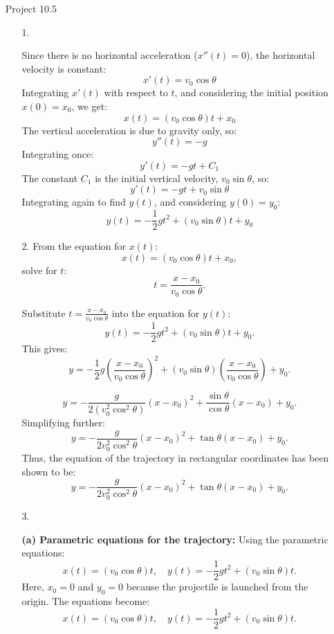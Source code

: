 \documentclass[12pt]{article}
\begin{document}
\begin{enumerate}
\item [Project 10.5]
\begin{enumerate}
    \item [1. ]
    \begin{enumerate} 
    
    Since there is no horizontal acceleration ($x''(t) = 0$), the horizontal velocity is constant:
    \[
    x'(t) = v_0 \cos \theta
    \]
    Integrating $x'(t)$ with respect to $t$, and considering the initial position $x(0) = x_0$, we get:
    \[
    x(t) = (v_0 \cos \theta) t + x_0
    \]
    The vertical acceleration is due to gravity only, so:
    \[
    y''(t) = -g
    \]
    Integrating once:
    \[
    y'(t) = -g t + C_1
    \]
    The constant $C_1$ is the initial vertical velocity, $v_0 \sin \theta$, so:
    \[
    y'(t) = -g t + v_0 \sin \theta
    \]
    Integrating again to find $y(t)$, and considering $y(0) = y_0$:
    \[
    y(t) = -\frac{1}{2} g t^2 + (v_0 \sin \theta) t + y_0
    \]
\end{enumerate}
    \item [2. ]
    From the equation for $x(t)$:
\[
x(t) = (v_0 \cos \theta) t + x_0,
\]
solve for $t$:
\[
t = \frac{x - x_0}{v_0 \cos \theta}.
\]

Substitute $t = \frac{x - x_0}{v_0 \cos \theta}$ into the equation for $y(t)$:
\[
y(t) = -\frac{1}{2} g t^2 + (v_0 \sin \theta) t + y_0.
\]
This gives:
\[
y = -\frac{1}{2} g \left(\frac{x - x_0}{v_0 \cos \theta}\right)^2 + (v_0 \sin \theta) \left(\frac{x - x_0}{v_0 \cos \theta}\right) + y_0.
\]

\[
y = -\frac{g}{2 (v_0^2 \cos^2 \theta)} (x - x_0)^2 + \frac{\sin \theta}{\cos \theta} (x - x_0) + y_0.
\]
Simplifying further:
\[
y = -\frac{g}{2 v_0^2 \cos^2 \theta} (x - x_0)^2 + \tan \theta (x - x_0) + y_0.
\]
Thus, the equation of the trajectory in rectangular coordinates has been shown to be:
\[
y = -\frac{g}{2 v_0^2 \cos^2 \theta} (x - x_0)^2 + \tan \theta (x - x_0) + y_0.
\]

\item [3. ] 

\textbf{(a) Parametric equations for the trajectory:}  
Using the parametric equations:
\[
x(t) = (v_0 \cos \theta) t, \quad y(t) = -\frac{1}{2} g t^2 + (v_0 \sin \theta) t.
\]
Here, $x_0 = 0$ and $y_0 = 0$ because the projectile is launched from the origin. The equations become:
\[
x(t) = (v_0 \cos \theta) t, \quad y(t) = -\frac{1}{2} g t^2 + (v_0 \sin \theta) t.
\]


\end{enumerate}
\end{enumerate}
\end{document}
